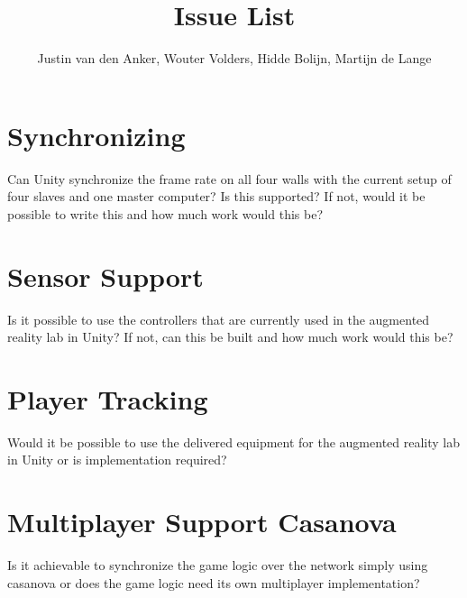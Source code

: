 \documentclass[10pt,a4paper]{article}
\author{Justin van den Anker, Wouter Volders, Hidde Bolijn, Martijn de Lange}
\title{Issue List}
\begin{document}
\maketitle
\section{Synchronizing}
Can Unity synchronize the frame rate on all four walls with the current setup of four slaves and one master computer? Is this supported? If not, would it be possible to write this and how much work would this be?

\section{Sensor Support}
Is it possible to use the controllers that are currently used in the augmented reality lab in Unity? If not, can this be built and how much work would this be?

\section{Player Tracking}
Would it be possible to use the delivered equipment for the augmented reality lab in Unity or is implementation required?


\section{Multiplayer Support Casanova}
Is it achievable to synchronize the game logic over the network simply using casanova or does the game logic need its own multiplayer implementation?
\end{document}
